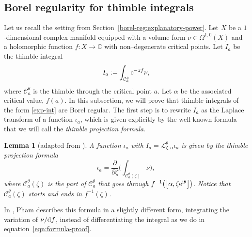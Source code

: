 \documentclass[pdftex]{sigma}
\newcommand{\maps}{\colon}
\newcommand{\C}{\mathbb{C}}
\newcommand{\laplace}{\mathcal{L}}
\numberwithin{equation}{section}
\newtheorem{Lemma}[Theorem]{Lemma}
\begin{document}
\subsection{Borel regularity for thimble integrals}\label{borel-reg-thimble}
Let us recall the setting from Section~\ref{borel-reg:explanatory-power}. Let $X$ be a $1$-dimensional complex manifold equipped with a volume form $\nu \in \Omega^{1,0}(X)$ and a holomorphic function $f\maps X\to\C$ with non--degenerate critical points. Let $I_a$ be the thimble integral
\begin{equation}\label{exp-int}
I_a := \int_{\mathcal{C}_a^\theta} {\rm e}^{-zf} \nu,
\end{equation}
where $\mathcal{C}_a^\theta$ is the thimble through the critical point $a$. Let $\alpha$ be the associated critical value, $f(a)$. In this subsection, we will prove that thimble integrals of the form \eqref{exp-int} are Borel regular. The first step is to rewrite $I_a$ as the Laplace transform of a function $\iota_a$, which is given explicitly by the well-known formula that we will call the \textit{thimble projection formula}.
%
\begin{Lemma}[adapted from {\cite[Section~3.3]{pham}}]\label{lem:thimble_proj_formula-proof}
A function $\iota_a$ with $I_a = \laplace_{\zeta, \alpha}^\theta \iota_a$ is given by the {\em thimble projection formula}
\begin{equation}\label{eqn:formula-proof}
\iota_a = \frac{\partial}{\partial \zeta} \bigg( \int_{\mathcal{C}_a^\theta(\zeta)}\nu \bigg),
\end{equation}
where $\mathcal{C}_a^\theta(\zeta)$ is the part of $\mathcal{C}_a^\theta$ that goes through $f^{-1}\bigl(\bigl[\alpha,\zeta {\rm e}^{{\rm i}\theta}\bigr]\bigr)$. Notice that $\mathcal{C}_a^\theta(\zeta)$ starts and ends in $f^{-1}(\zeta)$.
\end{Lemma}
\begin{Remark}
In \cite{pham}, Pham describes this formula in a slightly different form, integrating the variation of $\nu/{\rm d}f$, instead of differentiating the integral as we do in equation~\eqref{eqn:formula-proof}.
\end{Remark}
\end{document}
